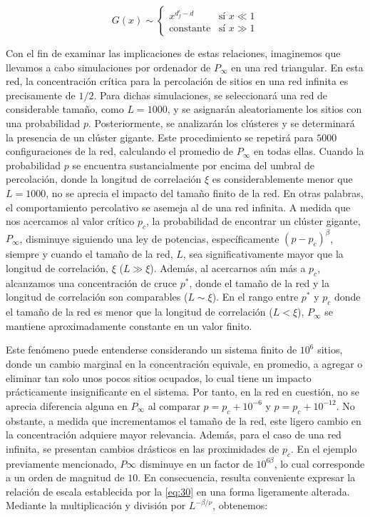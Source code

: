 \begin{equation}\label{eq:31}
G(x) \sim \begin{cases}
	x^{d_f^c-d} & \text{sí } x\ll 1\\
\text{constante} & \text{sí } x\gg1
\end{cases}
\end{equation}


Con el fin de examinar las implicaciones de estas relaciones, imaginemos que llevamos a cabo simulaciones por ordenador de $P_\infty$  en una red triangular. En esta red, la concentración crítica para la percolación de sitios en una red infinita es precisamente de $1/2$. Para dichas simulaciones, se seleccionará una red de considerable tamaño, como $L = 1000$, y se asignarán aleatoriamente los sitios con una probabilidad $p$. Posteriormente, se analizarán los clústeres y se determinará la presencia de un clúster gigante. Este procedimiento se repetirá para $5000$ configuraciones de la red, calculando el promedio de $P_\infty$ en todas ellas.  Cuando la probabilidad $p$ se encuentra sustancialmente por encima del umbral de percolación, donde la longitud de correlación $\xi$ es considerablemente menor que $L = 1000$, no se aprecia el impacto del tamaño finito de la red.  En otras palabras, el comportamiento percolativo se asemeja al de una red infinita. A medida que nos acercamos al valor crítico $p_c$, la probabilidad de encontrar un clúster gigante, $P_\infty$, disminuye siguiendo una ley de potencias, específicamente $\left(p-p_c\right)^\beta$, siempre y cuando el tamaño de la red, $L$, sea significativamente mayor que la longitud de correlación, $\xi$ ($L\gg\xi$). Además, al acercarnos aún más a $p_c$, alcanzamos una concentración de cruce $p^*$, donde el tamaño de la red y la longitud de correlación son comparables ($L \sim \xi$). En el rango entre $p^*$ y $p_c$ donde el tamaño de la red es menor que la longitud de correlación ($L < \xi$), $P_\infty$ se mantiene aproximadamente constante en un valor finito. 

Este fenómeno puede entenderse considerando un sistema finito de $10^6$ sitios, donde un cambio marginal en la concentración equivale, en promedio, a agregar o eliminar tan solo unos pocos sitios ocupados, lo cual tiene un impacto prácticamente insignificante en el sistema. Por tanto, en la red en cuestión, no se aprecia diferencia alguna en $P_\infty$ al comparar $p = p_c + 10^{-6}$ y $p = p_c + 10^{-12}$. No obstante, a medida que incrementamos el tamaño de la red, este ligero cambio en la concentración adquiere mayor relevancia. Además, para el caso de una red infinita, se presentan cambios drásticos en las proximidades de $p_c$. En el ejemplo previamente mencionado, $P\infty$ disminuye en un factor de $10^{6\beta}$, lo cual corresponde a un orden de magnitud de $10$. En consecuencia, resulta conveniente expresar la relación de escala establecida por la \cref{eq:30} en una forma ligeramente alterada. Mediante la multiplicación y división por $L^{-\beta/\nu}$, obtenemos:

